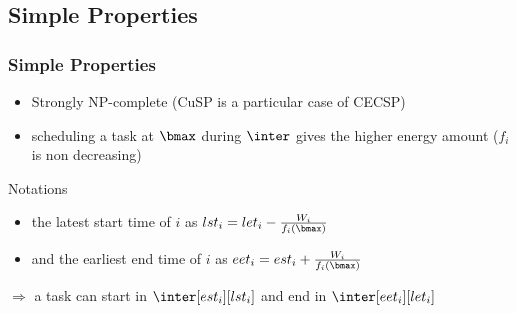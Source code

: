 \subsection{Simple Properties}
\begin{frame}
  \frametitle{Simple Properties}
  \begin{itemize}
\vfill
  \item Strongly NP-complete (CuSP is a particular case of CECSP)
\vfill
\pause
  \item scheduling a task at $\bmax$ during $\inter$ gives the higher energy amount ($f_i$ is non decreasing)
\vfill
\end{itemize}
\begin{center}
\end{center}
\pause
\vfill
  \begin{block}{Notations}
    \begin{itemize}
    \item the latest start time of $i$ as $lst_i=let_i-\frac{W_i}{f_i(\bmax)}$
    \item and the earliest end time of $i$ as $eet_i=est_i+\frac{W_i}{f_i(\bmax)}$
    \end{itemize}
  \end{block}
\vfill
\pause

  $\Rightarrow$ a task can start in $\inter[est_i][lst_i]$ and end in $\inter[eet_i][let_i]$
\vfill
\end{frame}
